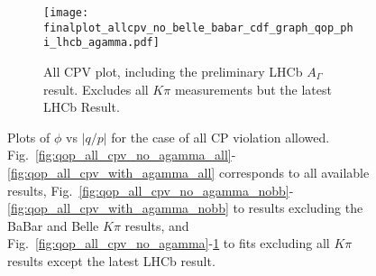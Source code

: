 \begin{figure}[tb]
\begin{center}
\begin{subfigure}[b]{0.3\textwidth}
      \centering
      \texttt{[image: finalplot\_allcpv\_no\_belle\_babar\_cdf\_graph\_qop\_phi\_lhcb\_agamma.pdf]}
      \caption{All CPV plot, including the preliminary LHCb $A_\Gamma$ result. Excludes all $K\pi$ measurements but the latest LHCb Result.}
      \label{fig:qop_all_cpv_with_agamma}
    \end{subfigure}%
  \end{center}
  \caption{Plots of $\phi$ vs $|q/p|$ for the case of all CP violation allowed. Fig.~\ref{fig:qop_all_cpv_no_agamma_all}-\ref{fig:qop_all_cpv_with_agamma_all}
corresponds to all available results, Fig.~\ref{fig:qop_all_cpv_no_agamma_nobb}-\ref{fig:qop_all_cpv_with_agamma_nobb} to results excluding the BaBar and Belle $K\pi$
 results, and Fig.~\ref{fig:qop_all_cpv_no_agamma}-\ref{fig:qop_all_cpv_with_agamma} to fits excluding all $K\pi$ results except the latest LHCb result.}
  \label{fig:qop_all_variations}
\end{figure}

%
